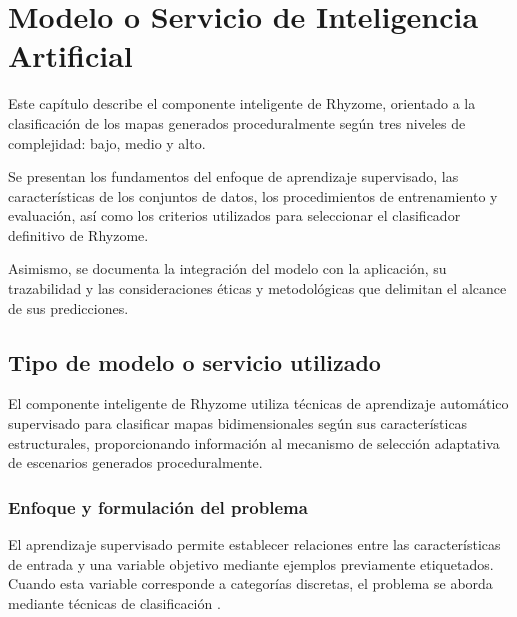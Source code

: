 
\chapter{Modelo o Servicio de Inteligencia Artificial}
\label{cap:04_modelo_ia}

Este capítulo describe el componente inteligente de Rhyzome, orientado a la clasificación de los mapas generados proceduralmente según tres niveles de complejidad: bajo, medio y alto.

Se presentan los fundamentos del enfoque de aprendizaje supervisado, las características de los conjuntos de datos, los procedimientos de entrenamiento y evaluación, así como los criterios utilizados para seleccionar el clasificador definitivo de Rhyzome.

Asimismo, se documenta la integración del modelo con la aplicación, su trazabilidad y las consideraciones éticas y metodológicas que delimitan el alcance de sus predicciones.


\section{Tipo de modelo o servicio utilizado}
\label{sec:tipo_modelo_ia}

El componente inteligente de Rhyzome utiliza técnicas de aprendizaje automático supervisado para clasificar mapas bidimensionales según sus características estructurales, proporcionando información al mecanismo de selección adaptativa de escenarios generados proceduralmente.


\subsection{Enfoque y formulación del problema}
\label{subsec:enfoque_aprendizaje}

El aprendizaje supervisado permite establecer relaciones entre las características de entrada y una variable objetivo mediante ejemplos previamente etiquetados. Cuando esta variable corresponde a categorías discretas, el problema se aborda mediante técnicas de clasificación \parencite{james2023}.

